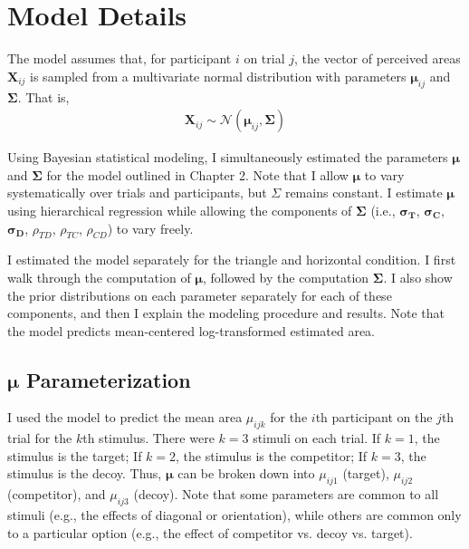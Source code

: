 \section{Model Details}

The model assumes that, for participant $i$ on trial $j$, the vector of perceived areas $\boldsymbol{X}_{ij}$ is sampled from a multivariate normal distribution with parameters $\boldsymbol{\mu}_{ij}$ and $\boldsymbol{\Sigma}$. That is,
\begin{align}
    \boldsymbol{X}_{ij} \sim \mathcal{N}(\boldsymbol{\mu}_{ij},\boldsymbol{\Sigma})
\end{align}

Using Bayesian statistical modeling, I simultaneously estimated the parameters  $\boldsymbol{\mu}$ and $\boldsymbol{\Sigma}$ for the model outlined in Chapter 2. Note that I allow $\boldsymbol{\mu}$ to vary systematically over trials and participants, but $\Sigma$ remains constant. I estimate $\boldsymbol{\mu}$ using hierarchical regression while allowing the components of $\boldsymbol{\Sigma}$ (i.e., $\boldsymbol{\sigma_{T}}$, $\boldsymbol{\sigma_{C}}$, $\boldsymbol{\sigma_{D}}$, $\rho_{TD}$, $\rho_{TC}$, $\rho_{CD}$) to vary freely. 

I estimated the model separately for the triangle and horizontal condition. I first walk through the computation of $\boldsymbol{\mu}$, followed by the computation $\boldsymbol{\Sigma}$. I also show the prior distributions on each parameter separately for each of these components, and then I explain the modeling procedure and results. Note that the model predicts mean-centered log-transformed estimated area.

\subsection{\texorpdfstring{$\boldsymbol{\mu}$}{mu} Parameterization}

I used the model to predict the mean area $\mu_{ijk}$ for the $i$th participant on the $j$th trial for the $k$th stimulus. There were $k=3$ stimuli on each trial. If $k=1$, the stimulus is the target; If $k=2$, the stimulus is the competitor; If $k=3$, the stimulus is the decoy. Thus, $\boldsymbol{\mu}$ can be broken down into $\mu_{ij1}$ (target), $\mu_{ij2}$ (competitor), and $\mu_{ij3}$ (decoy). Note that some parameters are common to all stimuli (e.g., the effects of diagonal or orientation), while others are common only to a particular option (e.g., the effect of competitor vs. decoy vs. target). 

